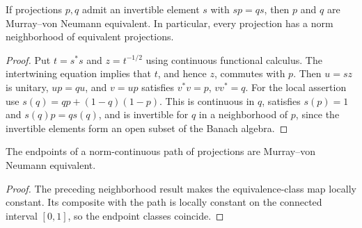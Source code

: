 \begin{proposition}\label{prop:projection-intertwiner-equivalence}
If projections $p,q$ admit an invertible element $s$ with $sp=qs$, then
$p$ and $q$ are Murray--von Neumann equivalent. In particular, every
projection has a norm neighborhood of equivalent projections.
\end{proposition}
\begin{proof}
\leanok
Put $t=s^*s$ and $z=t^{-1/2}$ using continuous functional calculus.
The intertwining equation implies that $t$, and hence $z$, commutes with $p$.
Then $u=sz$ is unitary, $up=qu$, and $v=up$ satisfies $v^*v=p$, $vv^*=q$.
For the local assertion use $s(q)=qp+(1-q)(1-p)$.
This is continuous in $q$, satisfies $s(p)=1$ and $s(q)p=qs(q)$,
and is invertible for $q$ in a neighborhood of $p$, since the invertible
elements form an open subset of the Banach algebra.
\end{proof}

\begin{proposition}\label{prop:projection-homotopy-invariance}
The endpoints of a norm-continuous path of projections are
Murray--von Neumann equivalent.
\end{proposition}
\begin{proof}
\leanok
The preceding neighborhood result makes the equivalence-class map locally
constant. Its composite with the path is locally constant on the connected
interval $[0,1]$, so the endpoint classes coincide.
\end{proof}

